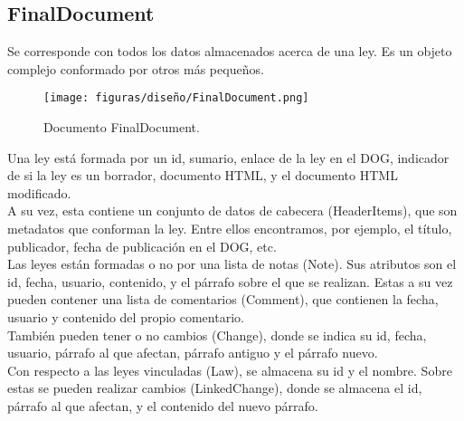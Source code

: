 \subsection{FinalDocument}

Se corresponde con todos los datos almacenados acerca de una ley. Es un objeto complejo conformado por otros más pequeños.

\begin{figure}[H]
\centerline{\texttt{[image: figuras/diseño/FinalDocument.png]}}
\caption{Documento FinalDocument.}
\label{enlaceFinalDocument}
\end{figure}

Una ley está formada por un id, sumario, enlace de la ley en el DOG, indicador de si la ley es un borrador, documento HTML, y el documento HTML modificado. 
\\

A su vez, esta contiene un conjunto de datos de cabecera (HeaderItems), que son metadatos que conforman la ley. Entre ellos encontramos, por ejemplo, el título, publicador, fecha de publicación en el DOG, etc.
\\

Las leyes están formadas o no por una lista de notas (Note). Sus atributos son el id, fecha, usuario, contenido, y el párrafo sobre el que se realizan. Estas a su vez pueden contener una lista de comentarios (Comment), que contienen la fecha, usuario y contenido del propio comentario.
\\

También pueden tener o no cambios (Change), donde se indica su id, fecha, usuario, párrafo al que afectan, párrafo antiguo y el párrafo nuevo.
\\

Con respecto a las leyes vinculadas (Law), se almacena su id y el nombre. Sobre estas se pueden realizar cambios (LinkedChange), donde se almacena el id, párrafo al que afectan, y el contenido del nuevo párrafo.